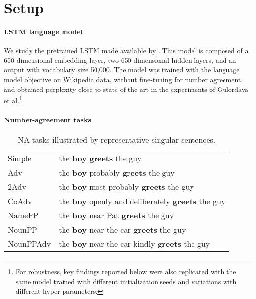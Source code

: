 \section{Setup}\label{sec:the_data}

\paragraph{LSTM language model}\label{ssec:lstm_lm}
We study the pretrained LSTM made available by
.  This model is composed of a
650-dimensional embedding layer, two 650-dimensional hidden layers,
and an output with vocabulary size 50,000. 
The model was trained with the language
model objective on Wikipedia data, without fine-tuning for number
agreement, and obtained perplexity close to state of the art in the experiments of Gulordava et al.\footnote{For robustness, key findings reported below were also replicated with the same model trained with different initialization seeds and variations with different hyper-parameters.} 


\paragraph{Number-agreement tasks}
\begin{table}[tb]
  \centering
  \begin{footnotesize}
  \begin{tabular}{l@{\hskip1pt}l}
    \B Simple & the \textbf{boy} \textbf{greets} the guy\\
    \B Adv & the \textbf{boy} probably \textbf{greets} the guy\\
    \B 2Adv & the \textbf{boy} most probably \textbf{greets} the guy\\
    \B CoAdv &  the \textbf{boy} openly and deliberately \textbf{greets} the guy\\
    \B NamePP & the \textbf{boy} near Pat \textbf{greets} the guy\\
    \B NounPP & the \textbf{boy} near the car \textbf{greets} the guy\\
    \B NounPPAdv & the \textbf{boy} near the car kindly \textbf{greets} the guy\\
  \end{tabular}
  \end{footnotesize}
  \caption{NA tasks illustrated by representative
    singular sentences.}
  \label{tab:data-sets}
\end{table}

